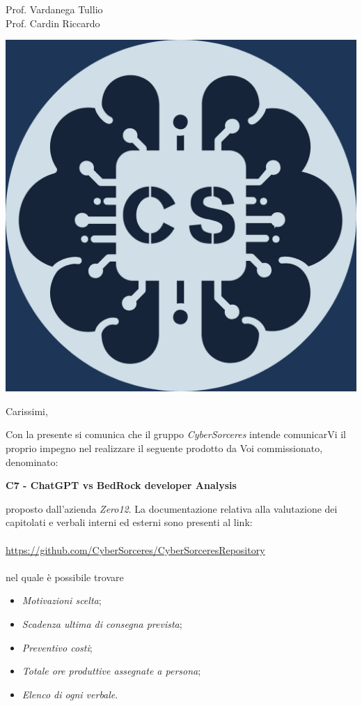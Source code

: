 \documentclass[12pt]{letter}
\begin{document}
\begin{letter}
{
	Prof. Vardanega Tullio \\
 	Prof. Cardin Riccardo
}



\includegraphics[scale=0.17]{images/logo.png}

\opening{Carissimi,}

Con la presente si comunica che il gruppo
\textit{CyberSorceres} intende comunicarVi il proprio 
impegno nel realizzare il seguente prodotto da Voi
commissionato, denominato:

\textbf{C7 - ChatGPT vs BedRock developer Analysis}

proposto dall'azienda \textit{Zero12}.
La documentazione relativa alla valutazione dei capitolati e verbali interni ed esterni sono presenti al link: 	\\ \\
\href{https://github.com/CyberSorceres/CyberSorceresRepository}{https://github.com/CyberSorceres/CyberSorceresRepository} \\ \\
nel quale è possibile trovare
\begin{itemize}
	\item \textit{Motivazioni scelta};
	\item \textit{Scadenza ultima di consegna prevista};
	\item \textit{Preventivo costi};
	\item \textit{Totale ore produttive assegnate a persona};
	\item \textit{Elenco di ogni verbale}.
\end{itemize}


\end{letter}
\end{document}
